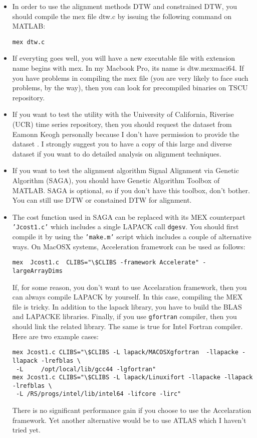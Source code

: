 \documentclass{article}
\begin{document}
\begin{itemize}
\item In order to use the alignment methods DTW and constrained DTW, you should compile the mex file dtw.c by issuing the following command on MATLAB:
\begin{verbatim}
mex dtw.c
\end{verbatim}

\item If everyting goes well, you will have a new executable file with extension name begins with mex. In my Macbook Pro, its name is dtw.mexmaci64. If you have problems in compiling the mex file (you are very likely to face such problems, by the way), then you can look for precompiled binaries on TSCU repository.

\item If you want to test the utility with the University of California, Riverise (UCR) time series repository, then you should request the dataset from Eamonn Keogh personally because I don't have permission to provide the dataset \cite{UCRWeb}. I strongly suggest you to have a copy of this large and diverse dataset if you want to do detailed analysis on alignment techniques.

\item If you want to test the alignment algorithm Signal Alignment via Genetic Algorithm (SAGA), you should have Genetic Algorithm Toolbox of MATLAB. SAGA is optional, so if you don't have this toolbox, don't bother. You can still use DTW or constained DTW for alignment.

\item The cost function used in SAGA can be replaced with its MEX counterpart \texttt{'Jcost1.c'} which includes a single LAPACK call \texttt{dgesv}. You should first compile it by using the \texttt{'make.m'} script which includes a couple of alternative ways. On MacOSX systems, Acceleration framework can be used as follows:
\begin{verbatim}
mex  Jcost1.c  CLIBS="\$CLIBS -framework Accelerate" -largeArrayDims 
\end{verbatim}

If, for some reason, you don't want to use Accelaration framework, then you can always compile LAPACK by yourself. In this case, compiling the MEX file is tricky. In addition to the lapack library, you have to build the BLAS and LAPACKE libraries. Finally, if you use \texttt{gfortran} compiler, then you should link the related library. The same is true for Intel Fortran compiler. Here are two example cases:

\begin{verbatim}
mex Jcost1.c CLIBS="\$CLIBS -L lapack/MACOSXgfortran  -llapacke -llapack -lrefblas \
 -L     /opt/local/lib/gcc44 -lgfortran"
mex Jcost1.c CLIBS="\$CLIBS -L lapack/Linuxifort -llapacke -llapack -lrefblas \
 -L /RS/progs/intel/lib/intel64 -lifcore -lirc"
\end{verbatim}

There is no significant performance gain if you choose to use the Accelaration framework. Yet
another alternative would be to use ATLAS which I haven't tried yet. 
\end{itemize}
\end{document}
